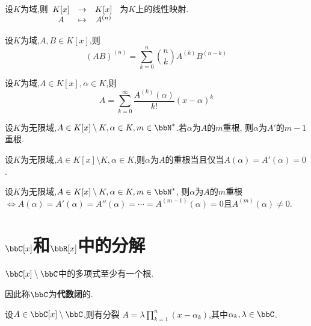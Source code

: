 \begin{prop}
    设$K$为域,则$\begin{array}[t]{ccc} K[x] & \to & K[x] \\ A & \mapsto & A^{(n)} \end{array}$
    为$K$上的线性映射.
\end{prop}

\begin{thm}[Leibniz]\label{thm:leibniz}
    设$K$为域,$A, B \in K[x]$,则\[ (AB)^{(n)} = \sum\limits_{k=0}^n \binom{n}{k} A^{(k)} B^{(n-k)} \]
\end{thm}

\begin{thm}[Taylor]
    设$K$为域,$A \in K[x], \alpha \in K$,则$$A = \sum\limits_{k = 0}^{\infty} 
    \dfrac{A^{(k)}(\alpha)}{k!} (x - \alpha)^k$$
\end{thm}

\begin{prop}
    设$K$为无限域,$A \in K[x] \setminus K, \alpha \in K, m \in \bbN^*$.若$\alpha$为$A$的$m$重根,
    则$\alpha$为$A'$的$m-1$重根.
\end{prop}

\begin{cor}
    设$K$为无限域,$A \in K[x] \setminus K, \alpha \in K$,则$\alpha$为$A$的重根当且仅当$A(\alpha) = A'(\alpha) = 0$.
\end{cor}

\begin{prop}
    设$K$为无限域,$A \in K[x] \setminus K, \alpha \in K, m \in \bbN^*$,
    则$\alpha$为$A$的$m$重根$\iff A(\alpha) = A'(\alpha) = A''(\alpha) = \cdots = A^{(m-1)}(\alpha) = 0
    \text{且} A^{(m)}(\alpha) \neq 0$.
\end{prop}

\section{$\bbC[x]$和$\bbR[x]$中的分解}

\begin{thm}[d'Alembert]
    $\bbC[x] \setminus \bbC$中的多项式至少有一个根.
\end{thm}

\begin{rqq}
    因此称$\bbC$为\textbf{代数闭}的.
\end{rqq}

\begin{prop}
    设$A \in \bbC[x] \setminus \bbC$,则有分裂
    $A = \lambda \prod\limits_{k = 1}^n (x - \alpha_k)$,其中$\alpha_k, \lambda \in \bbC$.
\end{prop}

